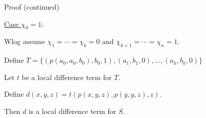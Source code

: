 \documentclass[notes=hide,12pt,xcolor=dvipsnames%
   ]{beamer}
\begin{document}
\begin{frame}[label=local-diff-term-res]{Proof (continued)}
  
  \underline{Case $\chi_0 = 1$}:
  
  Wlog assume
  $\chi_1 = \cdots =\chi_k = 0$
  and $\chi_{k+1} = \cdots = \chi_{n} = 1$.

  Define $T = \{(p(a_0, a_0, b_0), b_0, 1),
  (a_1, b_1, 0),  \dots, (a_k, b_k, 0)\}$

  Let $t$ be a local difference term for $T$.

  Define $d(x,y,z) = t(p(x,y,z), p(y,y,z), z)$. 

  Then $d$ is a local difference term for $S$.
\end{frame}
\end{document}
